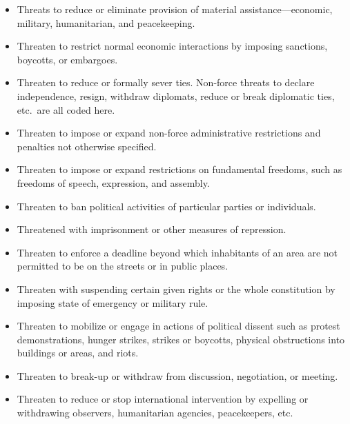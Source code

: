 \documentclass[11pt]{report}
\begin{document}
\begin{itemize}

\item Threats to reduce or eliminate provision of material assistance---economic, military, humanitarian, and peacekeeping.

\item Threaten to restrict normal economic interactions by imposing sanctions, boycotts, or embargoes.

\item Threaten to reduce or formally sever ties. Non-force threats to declare independence, resign, withdraw diplomats, reduce or break diplomatic ties, etc.\ are all coded here.

\item Threaten to impose or expand non-force administrative restrictions and penalties not otherwise specified.

\item Threaten to impose or expand restrictions on fundamental freedoms, such as freedoms of speech, expression, and assembly. 
\item Threaten to ban political activities of particular parties or individuals.
\item Threatened with imprisonment or other measures of repression.

\item Threaten to enforce a deadline beyond which inhabitants of an area are not permitted to be on the streets or in public places.

\item Threaten with suspending certain given rights or the whole constitution by imposing state of emergency or military rule.

\item Threaten to mobilize or engage in actions of political dissent such as protest demonstrations, hunger strikes, strikes or boycotts, physical obstructions into buildings or areas, and riots.

\item Threaten to break-up or withdraw from discussion, negotiation, or meeting.

\item Threaten to reduce or stop international intervention by expelling or withdrawing observers, humanitarian agencies, peacekeepers, etc.


\end{itemize}
\end{document}

